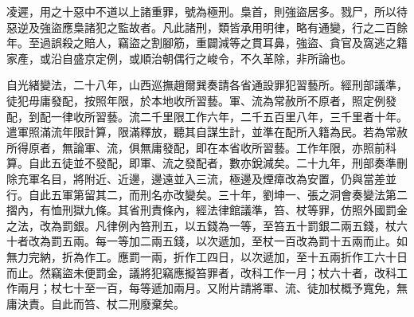 \begin{pinyinscope}
凌遲，用之十惡中不道以上諸重罪，號為極刑。梟首，則強盜居多。戮尸，所以待惡逆及強盜應梟諸犯之監故者。凡此諸刑，類皆承用明律，略有通變，行之二百餘年。至過誤殺之賠人，竊盜之割腳筋，重闢減等之貫耳鼻，強盜、貪官及窩逃之籍家產，或沿自盛京定例，或順治朝偶行之峻令，不久革除，非所論也。

自光緒變法，二十八年，山西巡撫趙爾巽奏請各省通設罪犯習藝所。經刑部議準，徒犯毋庸發配，按照年限，於本地收所習藝。軍、流為常赦所不原者，照定例發配，到配一律收所習藝。流二千里限工作六年，二千五百里八年，三千里者十年。遣軍照滿流年限計算，限滿釋放，聽其自謀生計，並準在配所入籍為民。若為常赦所得原者，無論軍、流，俱無庸發配，即在本省收所習藝。工作年限，亦照前科算。自此五徒並不發配，即軍、流之發配者，數亦銳減矣。二十九年，刑部奏準刪除充軍名目，將附近、近邊，邊遠並入三流，極邊及煙瘴改為安置，仍與當差並行。自此五軍第留其二，而刑名亦改變矣。三十年，劉坤一、張之洞會奏變法第二摺內，有恤刑獄九條。其省刑責條內，經法律館議準，笞、杖等罪，仿照外國罰金之法，改為罰銀。凡律例內笞刑五，以五錢為一等，至笞五十罰銀二兩五錢，杖六十者改為罰五兩。每一等加二兩五錢，以次遞加，至杖一百改為罰十五兩而止。如無力完納，折為作工。應罰一兩，折作工四日，以次遞加，至十五兩折作工六十日而止。然竊盜未便罰金，議將犯竊應擬笞罪者，改科工作一月；杖六十者，改科工作兩月；杖七十至一百，每等遞加兩月。又附片請將軍、流、徒加杖概予寬免，無庸決責。自此而笞、杖二刑廢棄矣。


\end{pinyinscope}
